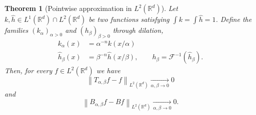 \documentclass{article}
\newtheorem{theorem}{Theorem}[section]
\theoremstyle{definition}
\newcommand{\R}{\mathbb{R}}
\newcommand{\norm}[1]{\left\lVert#1\right\rVert}
\newcommand{\fhat}[1]{\widehat{#1}}
\begin{document}
\begin{theorem}[Pointwise approximation in \(L^2(\R^d)\)]
\label{thm:regfouriermult_pwl2approx}
    Let \(k,\fhat{h}\in L^1(\R^d)\cap L^2(\R^d)\) be two functions satisfying \(\int k = \int \fhat{h} = 1\).
    Define the families \((k_\alpha)_{\alpha>0}\) and \((h_\beta)_{\beta>0}\)
    through dilation,
    \begin{align}
    \label{eq:approxiddilate_k}
        k_\alpha(x) &= \alpha^{-n} k(x/\alpha)\\
    \label{eq:approxiddilate_h}
        \fhat{h}_\beta(x) &= \beta^{-n} \fhat{h}(x/\beta),\qquad h_\beta = \mathcal{F}^{-1}(\fhat{h}_\beta).
    \end{align}
    Then, for every \(f\in L^2(\R^d)\) we have
    \begin{equation*}
        \norm{T_{\alpha,\beta}f - f}_{L^2(\R^d)}\xrightarrow[\alpha,\beta\to 0]{} 0
    \end{equation*}
    and
    \begin{equation*}
        \norm{B_{\alpha,\beta}f - Bf}_{L^2(\R^d)}\xrightarrow[\alpha,\beta\to 0]{} 0.
    \end{equation*}
\end{theorem}
\end{document}
